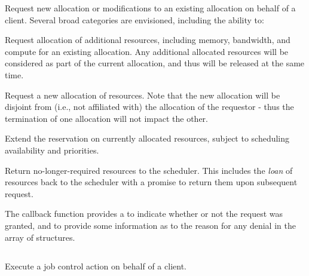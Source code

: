 Request new allocation or modifications to an existing allocation on behalf of a client. Several broad categories are envisioned, including the ability to:

\begin{compactitem}
%
\item Request allocation of additional resources, including memory, bandwidth, and compute for an existing allocation. Any additional allocated resources will be considered as part of the current allocation, and thus will be released at the same time.
%
\item Request a new allocation of resources. Note that the new allocation will be disjoint from (i.e., not affiliated with) the allocation of the requestor - thus the termination of one allocation will not impact the other.
%
\item Extend the reservation on currently allocated resources, subject to scheduling availability and priorities.
%
\item Return no-longer-required resources to the scheduler.
This includes the \textit{loan} of resources back to the scheduler with a promise to return them upon subsequent request.
\end{compactitem}

The callback function provides a  to indicate whether or not the request was granted, and to provide some information as to the reason for any denial in the  array of  structures.


\subsection{}

\summary

Execute a job control action on behalf of a client.

\format


